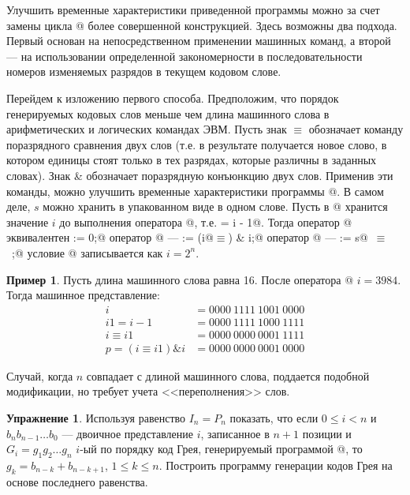 \documentclass[12pt,a4paper]{article}
\theoremstyle{plain}
\theoremstyle{definition}
\newtheorem*{task}{Упражнение}
\newtheorem*{example}{Пример}
\theoremstyle{remark}
\begin{document}
Улучшить временные характеристики приведенной программы можно за счет замены цикла @ более совершенной конструкцией. Здесь возможны два подхода. Первый основан на непосредственном применении машинных команд, а второй --- на использовании определенной закономерности в последовательности номеров изменяемых разрядов в текущем кодовом слове.

Перейдем к изложению первого способа. Предположим, что порядок генерируемых кодовых слов меньше чем длина машинного слова в арифметических и логических командах ЭВМ. Пусть знак $\equiv$ обозначает команду поразрядного сравнения двух слов (т.е. в результате получается новое слово, в котором единицы стоят только в тех разрядах, которые различны в заданных словах). Знак \& обозначает поразрядную конъюнкцию двух слов. Применив эти команды, можно улучшить временные характеристики программы @. В самом деле, $s$ можно хранить в упакованном виде в одном слове. Пусть в @ хранится значение $i$ до выполнения оператора @, т.е.  = i - 1@. Тогда оператор @ эквивалентен \verb@s := 0;@ оператор @ --- \verb@p := (i@$\equiv$) & i;@ оператор @ --- \verb@s := s@~$\equiv$~\verb@p;@ условие @ записывается как $i = 2^n$.

\begin{example}
Пусть длина машинного слова равна 16. После оператора @ $i=3984$. Тогда машинное представление:
\[
\begin{aligned}
i &= 0000\: 1111\: 1001\: 0000 \\
i1 = i-1 &= 0000\: 1111\: 1000\: 1111 \\
i \equiv i1 &= 0000\: 0000\: 0001\: 1111 \\
p=(i \equiv i1) \& i &= 0000\: 0000\: 0001\: 0000
\end{aligned}
\]
\end{example}

Случай, когда $n$ совпадает с длиной машинного слова, поддается подобной модификации, но требует учета <<переполнения>> слов.

\begin{task}
Используя равенство $I_n = P_n$ показать, что если $0\le i<n$ и $b_n b_{n-1}\ldots b_0$ --- двоичное представление $i$, записанное в $n+1$ позиции и $G_i = g_1 g_2 \ldots g_n$ $i$-ый по порядку код Грея, генерируемый программой @, то $g_k = b_{n-k}+b_{n-k+1}$, $1\le k\le n$. Построить программу генерации кодов Грея на основе последнего равенства.
\end{task}
\end{document}
